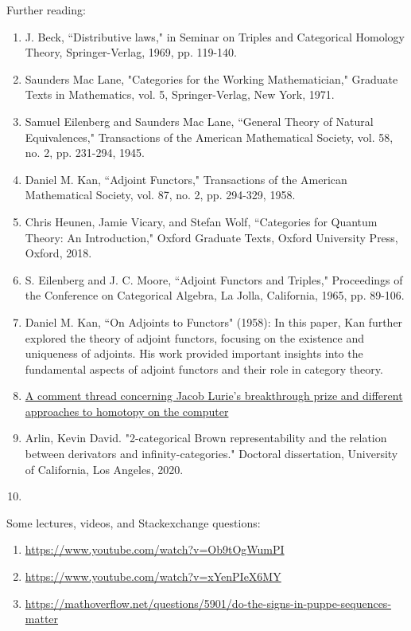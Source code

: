 \documentclass{book}
\theoremstyle{definition}
\begin{document}
Further reading:

\begin{enumerate}
\item J. Beck, ``Distributive laws," in Seminar on Triples and Categorical Homology Theory, Springer-Verlag, 1969, pp. 119-140.
\item Saunders Mac Lane, "Categories for the Working Mathematician," Graduate Texts in Mathematics, vol. 5, Springer-Verlag, New York, 1971.
\item Samuel Eilenberg and Saunders Mac Lane, ``General Theory of Natural Equivalences," Transactions of the American Mathematical Society, vol. 58, no. 2, pp. 231-294, 1945.
\item Daniel M. Kan, ``Adjoint Functors," Transactions of the American Mathematical Society, vol. 87, no. 2, pp. 294-329, 1958.
\item Chris Heunen, Jamie Vicary, and Stefan Wolf, ``Categories for Quantum Theory: An Introduction," Oxford Graduate Texts, Oxford University Press, Oxford, 2018.
\item S. Eilenberg and J. C. Moore, ``Adjoint Functors and Triples," Proceedings of the Conference on Categorical Algebra, La Jolla, California, 1965, pp. 89-106.
\item Daniel M. Kan, ``On Adjoints to Functors" (1958): In this paper, Kan further explored the theory of adjoint functors, focusing on the existence and uniqueness of adjoints. His work provided important insights into the fundamental aspects of adjoint functors and their role in category theory.
\item \href{https://mathematicswithoutapologies.wordpress.com/2015/05/13/univalent-foundations-no-comment/}{A comment thread concerning Jacob Lurie's breakthrough prize and different approaches to homotopy on the computer}
\item Arlin, Kevin David. "2-categorical Brown representability and the relation between derivators and infinity-categories." Doctoral dissertation, University of California, Los Angeles, 2020.
\item 
\end{enumerate}

Some lectures, videos, and Stackexchange questions:

\begin{enumerate}
\item \url{https://www.youtube.com/watch?v=Ob9tOgWumPI}
\item \url{https://www.youtube.com/watch?v=xYenPIeX6MY}
\item \url{https://mathoverflow.net/questions/5901/do-the-signs-in-puppe-sequences-matter}
\end{enumerate}
\end{document}
